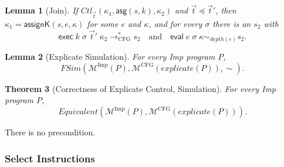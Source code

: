 \documentclass[10pt]{article}
\theoremstyle{acmplain}
\newtheorem{theorem}{Theorem}[section]
\newtheorem{lemma}[theorem]{Lemma}
\newcommand{\key}[1]{\mathsf{#1}}
\newcommand{\pass}[1]{\mathit{#1}}
\newcommand{\Mach}[1]{\mathcal{M}^{#1}}
\newcommand{\Equiv}{\mathit{Equivalent}}
\newcommand{\FSim}{\mathit{FSim}}
\newcommand{\Kf}[2]{\key{#1}(#2)}
\newcommand{\evi}[3]{\key{eval}\;#1\;#2\;#3}
\newcommand{\exc}[4]{\key{exec}\;#1\;#2\;#3\;#4}
\newcommand{\lto}{\longrightarrow}
\begin{document}
\begin{lemma}[Join]\label{lem:join}
If $\mathit{Ctl}_{\vec{t}}(\kappa_1, \key{asg}(s, k), \kappa_2)$ and
$\vec{t} \preceq \vec{t}'$, then $\kappa_1 = \Kf{assignK}{s, e, \kappa}$
for some $e$ and $\kappa$, and for every $\sigma$ there is an $s_2$ with
\[
  \exc{k}{\sigma}{\vec{t}'}{\kappa_2} \lto^*_{\mathrm{CFG}} s_2
  \quad\text{and}\quad \evi{e}{\sigma}{\kappa} \sim_{\mathit{depth}(e)} s_2 .
\]
\end{lemma}

\begin{lemma}[Explicate Simulation]\label{lem:explicate-fsim}
For every Imp program $P$,
\[
  \FSim(\Mach{\mathrm{Imp}}(P), \Mach{\mathrm{CFG}}(\pass{explicate}(P)), \sim) .
\]
\end{lemma}

\begin{theorem}[Correctness of Explicate Control, Simulation]\label{thm:explicate-sim}
For every Imp program $P$,
\[
  \Equiv(\Mach{\mathrm{Imp}}(P), \Mach{\mathrm{CFG}}(\pass{explicate}(P))) .
\]
\end{theorem}
There is no precondition.

\subsubsection{Select Instructions}\label{sec:sim-select}
\end{document}
